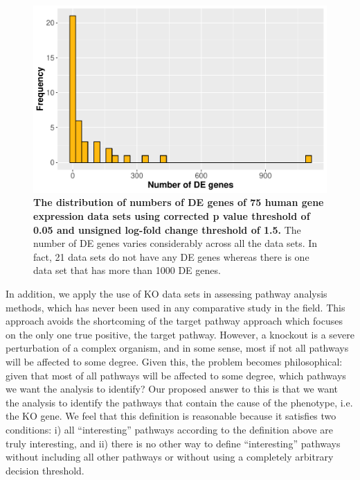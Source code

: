\documentclass[Minh_PhD_thesis.tex]{subfiles}
\begin{document}
\begin{figure}
\centering
  \captionsetup{width=.6\linewidth}
	\includegraphics[width=0.6\linewidth]{../Figures/NrDE75}
	\caption{\textbf{The distribution of numbers of DE genes of 75 human gene expression data sets using corrected p value threshold of 0.05 and unsigned log-fold change threshold of 1.5.} The number of DE genes varies considerably across all the data sets. In fact, 21 data sets do not have any DE genes whereas there is one data set that has more than 1000 DE genes.}\label{fig:NrDE75}
\end{figure}

%

In addition, we apply the use of KO data sets in assessing pathway analysis methods, which has never been used in any comparative study in the field.
This approach avoids the shortcoming of the target pathway approach  which focuses on the only one true positive, the target pathway.
However, a knockout is a severe perturbation of a complex organism, and in some sense, most if not all pathways will be affected to some degree.  Given this, the problem becomes philosophical: given that most of all pathways will be affected to some degree, which pathways we want the analysis to identify? Our proposed answer to this is that we want the analysis to identify the pathways that contain the cause of the phenotype, i.e. the KO gene. We feel that this definition is reasonable because it satisfies two conditions: i) all ``interesting'' pathways according to the definition above are truly interesting, and ii) there is no other way to define ``interesting'' pathways without including all other pathways or without using a completely arbitrary decision threshold.
\end{document}
